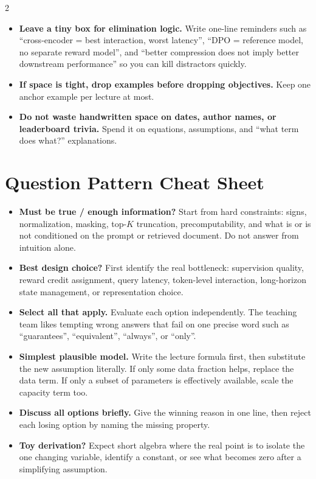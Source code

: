 \documentclass[10pt]{article}
\begin{document}
\begin{multicols*}{2}
\begin{itemize}
\item \textbf{Leave a tiny box for elimination logic.} Write one-line reminders such as ``cross-encoder = best interaction, worst latency'', ``DPO = reference model, no separate reward model'', and ``better compression does not imply better downstream performance'' so you can kill distractors quickly.
\item \textbf{If space is tight, drop examples before dropping objectives.} Keep one anchor example per lecture at most.
\item \textbf{Do not waste handwritten space on dates, author names, or leaderboard trivia.} Spend it on equations, assumptions, and ``what term does what?'' explanations.
\end{itemize}

\section*{Question Pattern Cheat Sheet}
\begin{itemize}
\item \textbf{Must be true / enough information?} Start from hard constraints: signs, normalization, masking, top-\(K\) truncation, precomputability, and what is or is not conditioned on the prompt or retrieved document. Do not answer from intuition alone.
\item \textbf{Best design choice?} First identify the real bottleneck: supervision quality, reward credit assignment, query latency, token-level interaction, long-horizon state management, or representation choice.
\item \textbf{Select all that apply.} Evaluate each option independently. The teaching team likes tempting wrong answers that fail on one precise word such as ``guarantees'', ``equivalent'', ``always'', or ``only''.
\item \textbf{Simplest plausible model.} Write the lecture formula first, then substitute the new assumption literally. If only some data fraction helps, replace the data term. If only a subset of parameters is effectively available, scale the capacity term too.
\item \textbf{Discuss all options briefly.} Give the winning reason in one line, then reject each losing option by naming the missing property.
\item \textbf{Toy derivation?} Expect short algebra where the real point is to isolate the one changing variable, identify a constant, or see what becomes zero after a simplifying assumption.
\end{itemize}


\end{multicols*}
\end{document}

